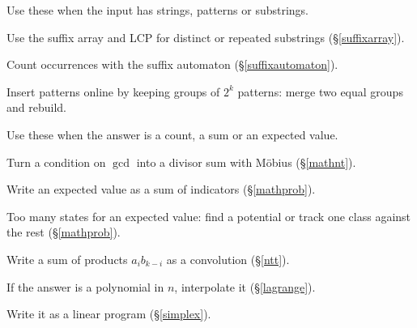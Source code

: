 {%
Use these when the input has strings, patterns or substrings.
\begin{checks}
	\item Use the suffix array and LCP for distinct or repeated substrings (\S\ref{suffixarray}).
	\item Count occurrences with the suffix automaton (\S\ref{suffixautomaton}).
	\item Insert patterns online by keeping groups of $2^k$ patterns: merge two equal groups and rebuild.
\end{checks}
Use these when the answer is a count, a sum or an expected value.
\begin{checks}
	\item Turn a condition on $\gcd$ into a divisor sum with Möbius (\S\ref{mathnt}).
	\item Write an expected value as a sum of indicators (\S\ref{mathprob}).
	\item Too many states for an expected value: find a potential or track one class against the rest (\S\ref{mathprob}).
	\item Write a sum of products $a_i b_{k-i}$ as a convolution (\S\ref{ntt}).
	\item If the answer is a polynomial in $n$, interpolate it (\S\ref{lagrange}).
	\item Write it as a linear program (\S\ref{simplex}).
\end{checks}
}
